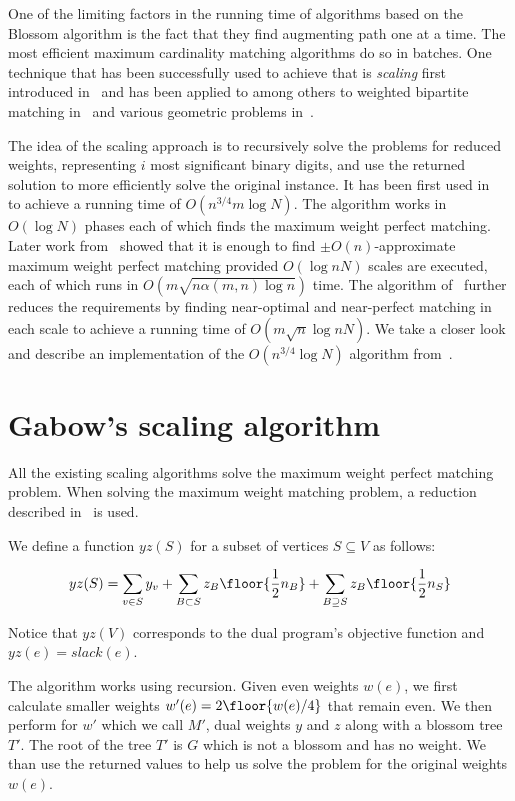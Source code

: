 
One of the limiting factors in the running time of algorithms based on the Blossom algorithm is the fact that they find augmenting path one at a time. The most efficient maximum cardinality matching algorithms do so in batches. One technique that has been successfully used to achieve that is \textit{scaling} first introduced in~\cite{edmonds1972theoretical} and has been applied to among others to weighted bipartite matching in~\cite{gabow1989faster} and various geometric problems in~\cite{gabow1984scaling}. 

The idea of the scaling approach is to recursively solve the problems for reduced weights, representing $i$ most significant binary digits, and use the returned solution to more efficiently solve the original instance. It has been first used in~\cite{gabow1985scaling} to achieve a running time of $O(n^{3/4}m \log N)$. The algorithm works in $O(\log N)$ phases each of which finds the maximum weight perfect matching. Later work from~\cite{gabow1991faster} showed that it is enough to find $\pm O(n)$-approximate maximum weight perfect matching provided $O(\log nN)$ scales are executed, each of which runs in $O(m\sqrt{n \alpha(m,n)\log n})$ time. The algorithm of~\cite{duan2018scaling} further reduces the requirements by finding near-optimal and near-perfect matching in each scale to achieve a running time of $O(m \sqrt{n} \log nN)$. We take a closer look and describe an implementation of the $O(n^{3/4}\log N)$ algorithm from~\cite{gabow1985scaling}.

\section{Gabow's scaling algorithm}

All the existing scaling algorithms solve the maximum weight perfect matching problem. When solving the maximum weight matching problem, a reduction described in~ is used.

We define a function $yz(S)$ for a subset of vertices $S \subseteq V$ as follows:

\[
yz(S) = \sum_{v \in S} y_v + \sum_{B \subset S} z_B \floor{\frac{1}{2}n_B} + \sum_{B \supseteq S} z_B \floor{\frac{1}{2}n_S}
\]

Notice that $yz(V)$ corresponds to the dual program's objective function and $yz(e) = slack(e)$.

The algorithm works using recursion. Given even weights $w(e)$, we first calculate smaller weights $w'(e) = 2\floor{ w(e)/4 }$ that remain even. We then perform for $w'$ which we call $M'$, dual weights $y$ and $z$ along with a blossom tree $T'$. The root of the tree $T'$ is $G$ which is not a blossom and has no weight. We than use the returned values to help us solve the problem for the original weights $w(e)$.

